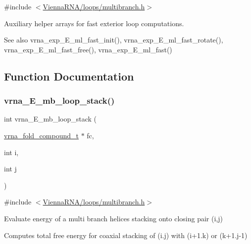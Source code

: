 {\ttfamily \#include $<$\mbox{\hyperlink{multibranch_8h}{Vienna\+R\+N\+A/loops/multibranch.\+h}}$>$}



Auxiliary helper arrays for fast exterior loop computations. 

\begin{DoxySeeAlso}{See also}
vrna\+\_\+exp\+\_\+\+E\+\_\+ml\+\_\+fast\+\_\+init(), vrna\+\_\+exp\+\_\+\+E\+\_\+ml\+\_\+fast\+\_\+rotate(), vrna\+\_\+exp\+\_\+\+E\+\_\+ml\+\_\+fast\+\_\+free(), vrna\+\_\+exp\+\_\+\+E\+\_\+ml\+\_\+fast() 
\end{DoxySeeAlso}


\subsection{Function Documentation}
\mbox{\label{group__eval__loops__mb_ga91af6d5fcb0aef243a4071cf9e718020}} 
\subsubsection{\texorpdfstring{vrna\_E\_mb\_loop\_stack()}{vrna\_E\_mb\_loop\_stack()}}
{\footnotesize\ttfamily int vrna\+\_\+\+E\+\_\+mb\+\_\+loop\+\_\+stack (\begin{DoxyParamCaption}\item[{\mbox{\hyperlink{group__fold__compound_ga1b0cef17fd40466cef5968eaeeff6166}{vrna\+\_\+fold\+\_\+compound\+\_\+t}} $\ast$}]{fc,  }\item[{int}]{i,  }\item[{int}]{j }\end{DoxyParamCaption})}



{\ttfamily \#include $<$\mbox{\hyperlink{multibranch_8h}{Vienna\+R\+N\+A/loops/multibranch.\+h}}$>$}



Evaluate energy of a multi branch helices stacking onto closing pair (i,j) 

Computes total free energy for coaxial stacking of (i.\+j) with (i+1.k) or (k+1.j-\/1) 